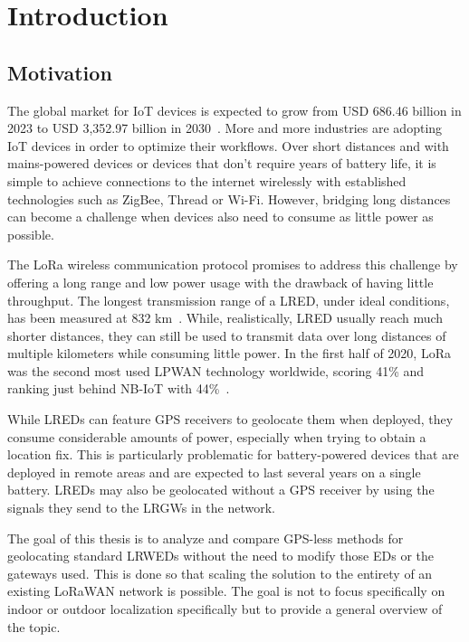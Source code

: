 \chapter{Introduction}

\section{Motivation}

The global market for \ac{IoT} devices is expected to grow from USD 686.46 billion in 2023 to USD 3,352.97 billion in 2030~\cite{statista_industrial_2023}.
More and more industries are adopting \ac{IoT} devices in order to optimize their workflows.
Over short distances and with mains-powered devices or devices that don't require years of battery life, it is simple to achieve connections to the internet wirelessly with established technologies such as ZigBee, Thread or Wi-Fi.
However, bridging long distances can become a challenge when devices also need to consume as little power as possible.

The \ac{LoRa} wireless communication protocol promises to address this challenge by offering a long range and low power usage with the drawback of having little throughput.
The longest transmission range of a \acl{LRED}, under ideal conditions, has been measured at 832 km~\cite{the_things_network_global_team_lora_nodate}.
While, realistically, \acl{LRED} usually reach much shorter distances, they can still be used to transmit data over long distances of multiple kilometers while consuming little power.
In the first half of 2020, \ac{LoRa} was the second most used \ac{LPWAN} technology worldwide, scoring 41\% and ranking just behind NB-IoT with 44\%~\cite{iot_analytics_lpwa_2020}.

While \aclp{LRED} can feature \ac{GPS} receivers to geolocate them when deployed, they consume considerable amounts of power, especially when trying to obtain a location fix.
This is particularly problematic for battery-powered devices that are deployed in remote areas and are expected to last several years on a single battery.
\aclp{LRED} may also be geolocated without a \ac{GPS} receiver by using the signals they send to the \aclp{LRGW} in the network.

The goal of this thesis is to analyze and compare \ac{GPS}-less methods for geolocating standard \aclp{LRWED} without the need to modify those \aclp{ED} or the gateways used.
This is done so that scaling the solution to the entirety of an existing \ac{LoRaWAN} network is possible.
The goal is not to focus specifically on indoor or outdoor localization specifically but to provide a general overview of the topic.

